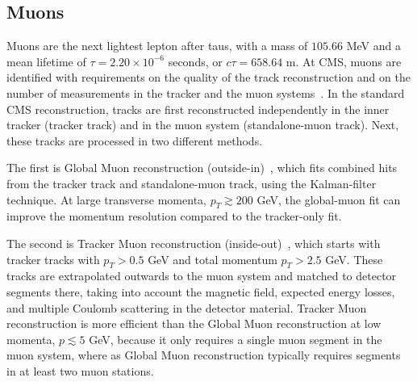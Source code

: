 \subsection{Muons}
\label{section:ch-5-muon-reconstruction}
Muons are the next lightest lepton after taus, with a mass of $105.66$ MeV and a mean lifetime of $\tau = 2.20 \times 10^{-6}$ seconds, or $c\tau = 658.64$ m. At CMS, muons are identified with requirements on the quality of the track reconstruction and on the number of measurements in the tracker and the muon systems~\citep{CMS-MUO-10-004}. In the standard CMS reconstruction, tracks are first reconstructed independently in the inner tracker (tracker track) and in the muon system (standalone-muon track). Next, these tracks are processed in two different methods.

The first is Global Muon reconstruction (outside-in)~\citep{CMS-MUO-10-004}, which fits combined hits from the tracker track and standalone-muon track, using the Kalman-filter technique. At large transverse momenta, $p_{T} \gtrsim 200$ GeV, the global-muon fit can improve the momentum resolution compared to the tracker-only fit. 

The second is Tracker Muon reconstruction (inside-out)~\citep{CMS-MUO-10-004}, which starts with tracker tracks with $p_{T} > 0.5$ GeV and total momentum $p_{T} > 2.5$ GeV. These tracks are extrapolated outwards to the muon system and matched to detector segments there, taking into account the magnetic field, expected energy losses, and multiple Coulomb scattering in the detector material. Tracker Muon reconstruction is more efficient than the Global Muon reconstruction at low momenta, $p \lesssim 5$ GeV, because it only requires a single muon segment in the muon system, where as Global Muon reconstruction typically requires segments in at least two muon stations.

